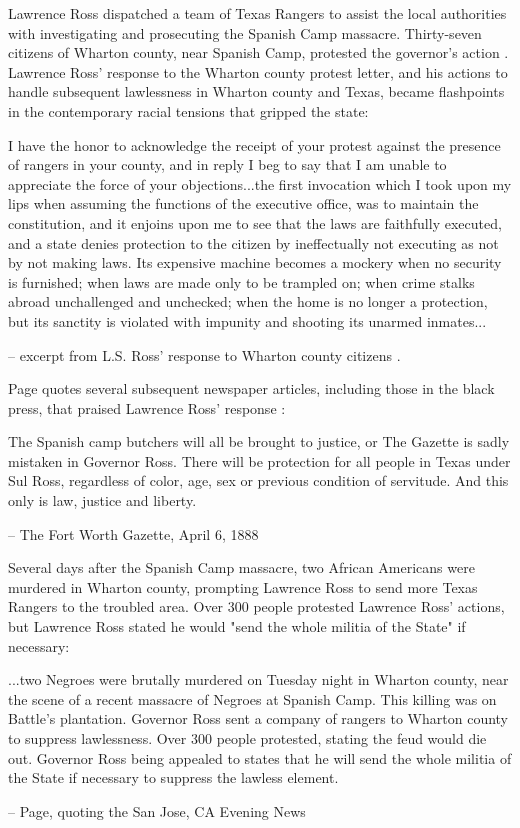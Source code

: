\documentclass[12pt]{article}
\begin{document}
Lawrence Ross dispatched a team of Texas Rangers to assist the local authorities with investigating and prosecuting the Spanish Camp massacre. Thirty-seven citizens of Wharton county, near Spanish Camp, protested the governor's action \cite[pg. 104--106]{page}. Lawrence Ross' response to the Wharton county protest letter, and his actions to handle subsequent lawlessness in Wharton county and Texas, became flashpoints in the contemporary racial tensions that gripped the state:
\begin{displayquote}
I have the honor to acknowledge the receipt of your protest against the presence of rangers in your county, and in reply I beg to say that I am unable to appreciate the force of your objections...the first invocation which I took upon my lips when assuming the functions of the executive office, was to maintain the constitution, and it enjoins upon me to see that the laws are faithfully executed, and a state denies protection to the citizen by ineffectually not executing as not by not making laws. Its expensive machine becomes a mockery when no security is furnished; when laws are made only to be trampled on; when crime stalks abroad unchallenged and unchecked; when the home is no longer a protection, but its sanctity is violated with impunity and shooting its unarmed inmates...

-- excerpt from L.S. Ross' response to Wharton county citizens \cite{gdaily:1888-03-21}.
\end{displayquote} 

Page quotes several subsequent newspaper articles, including those in the black press, that praised Lawrence Ross' response \cite[pg. 106--108]{page}:
\begin{displayquote}
The Spanish camp butchers will all be brought to justice, or The Gazette is sadly mistaken in Governor Ross. There will be protection for all people in Texas under Sul Ross, regardless of color, age, sex or previous condition of servitude. And this only is law, justice and liberty.

-- The Fort Worth Gazette, April 6, 1888 \cite{fwg:1888-04-06}
\end{displayquote}

Several days after the Spanish Camp massacre, two African Americans were murdered in Wharton county, prompting Lawrence Ross to send more Texas Rangers to the troubled area. Over 300 people protested Lawrence Ross' actions, but Lawrence Ross stated he would "send the whole militia of the State" if necessary:
\begin{displayquote}
...two Negroes were brutally murdered on Tuesday night in Wharton county, near the scene of a recent massacre of Negroes at Spanish Camp. This killing was on Battle’s plantation. Governor Ross sent a company of rangers to Wharton county to suppress lawlessness. Over 300 people protested, stating the feud would die out. Governor Ross being appealed to states that he will send the whole militia of the State if necessary to suppress the lawless element. 

-- Page, quoting the San Jose, CA Evening News \cite[pg. 101]{page} 
\end{displayquote}
\end{document}
